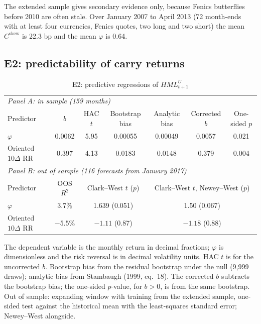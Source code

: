 \documentclass[11pt]{article}
\theoremstyle{result}
\newcommand{\HML}{\mathit{HML}}
\newcommand{\Cskew}{C^{\mathrm{skew}}}
\newcommand{\D}{\Delta}
\begin{document}
The extended sample gives secondary evidence only, because Fenics butterflies before 2010 are often stale. Over January 2007 to April 2013 (72 month-ends with at least four currencies, Fenics quotes, two long and two short) the mean $\Cskew$ is 22.3 bp and the mean $\varphi$ is 0.64.

\subsection{E2: predictability of carry returns}\label{sec:e2}

\begin{table}[t]
\centering\footnotesize
\setlength{\tabcolsep}{4pt}
\caption{E2: predictive regressions of $\HML^U_{t+1}$}\label{tab:e2}
\begin{tabular}{lcccccc}
\toprule
\multicolumn{7}{l}{\emph{Panel A: in sample (159 months)}}\\
Predictor & $b$ & HAC $t$ & Bootstrap bias & Analytic bias & Corrected $b$ & One-sided $p$ \\
\midrule
$\varphi$ & 0.0062 & 5.95 & 0.00055 & 0.00049 & 0.0057 & 0.021 \\
Oriented $10\D$ RR & 0.397 & 4.13 & 0.0183 & 0.0148 & 0.379 & 0.004 \\
\midrule
\multicolumn{7}{l}{\emph{Panel B: out of sample (116 forecasts from January 2017)}}\\
Predictor & OOS $R^2$ & \multicolumn{2}{c}{Clark--West $t$ ($p$)} & \multicolumn{3}{c}{Clark--West $t$, Newey--West ($p$)} \\
\midrule
$\varphi$ & 3.7\% & \multicolumn{2}{c}{1.639 (0.051)} & \multicolumn{3}{c}{1.50 (0.067)} \\
Oriented $10\D$ RR & $-5.5$\% & \multicolumn{2}{c}{$-1.11$ (0.87)} & \multicolumn{3}{c}{$-1.18$ (0.88)} \\
\bottomrule
\end{tabular}
\par\medskip
\begin{minipage}{0.97\linewidth}\footnotesize
The dependent variable is the monthly return in decimal fractions; $\varphi$ is dimensionless and the risk reversal is in decimal volatility units. HAC $t$ is for the uncorrected $b$. Bootstrap bias from the residual bootstrap under the null (9,999 draws); analytic bias from Stambaugh (1999, eq.~18). The corrected $b$ subtracts the bootstrap bias; the one-sided $p$-value, for $b>0$, is from the same bootstrap. Out of sample: expanding window with training from the extended sample, one-sided test against the historical mean with the least-squares standard error; Newey--West alongside.
\end{minipage}
\end{table}
\end{document}
